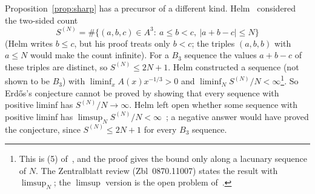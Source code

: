 \documentclass[11pt]{amsart}
\theoremstyle{remark}
\begin{document}
Proposition~\ref{prop:sharp} has a precursor of a different kind. Helm~\cite{Helm96b} considered the two-sided count
\[
S^{(N)}=\#\{(a,b,c)\in A^3:\ a\le b<c,\ |a+b-c|\le N\}
\]
(Helm writes $b\le c$, but his proof treats only $b<c$; the triples $(a,b,b)$ with $a\le N$ would make the count infinite). For a $B_3$ sequence the values $a+b-c$ of these triples are distinct, so $S^{(N)}\le2N+1$. Helm constructed a sequence (not shown to be $B_3$) with $\liminf_xA(x)x^{-1/3}>0$ and $\liminf_NS^{(N)}/N<\infty$\footnote{This is (5) of~\cite[p.~466]{Helm96b}, and the proof gives the bound only along a lacunary sequence of $N$. The Zentralblatt review (Zbl~0870.11007) states the result with $\limsup_N$; the $\limsup$ version is the open problem of~\cite[p.~468]{Helm96b}.}. So Erd\H{o}s's conjecture cannot be proved by showing that every sequence with positive liminf has $S^{(N)}/N\to\infty$. Helm left open whether some sequence with positive liminf has $\limsup_NS^{(N)}/N<\infty$~\cite{Helm96b}; a negative answer would have proved the conjecture, since $S^{(N)}\le2N+1$ for every $B_3$ sequence.
\end{document}
